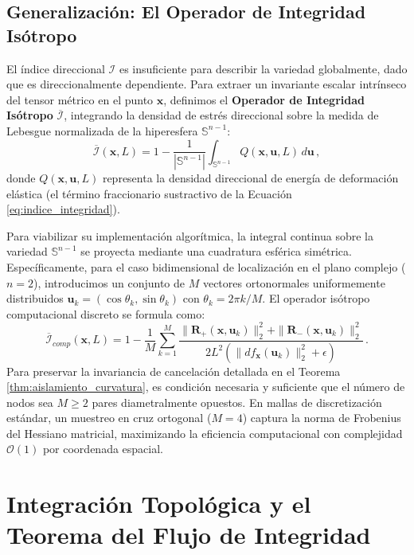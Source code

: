 \documentclass[11pt]{article}
\begin{document}
\subsection{Generalización: El Operador de Integridad Isótropo}

El índice direccional $\mathcal{I}$ es insuficiente para describir la variedad globalmente, dado que es direccionalmente dependiente. Para extraer un invariante escalar intrínseco del tensor métrico en el punto $\mathbf{x}$, definimos el \textbf{Operador de Integridad Isótropo} $\overline{\mathcal{I}}$, integrando la densidad de estrés direccional sobre la medida de Lebesgue normalizada de la hiperesfera $\mathbb{S}^{n-1}$:
\begin{equation}
    \overline{\mathcal{I}}(\mathbf{x}, L) = 1 - \frac{1}{|\mathbb{S}^{n-1}|} \int_{\mathbb{S}^{n-1}} Q(\mathbf{x}, \mathbf{u}, L) \, d\mathbf{u} \,,
\end{equation}
donde $Q(\mathbf{x}, \mathbf{u}, L)$ representa la densidad direccional de energía de deformación elástica (el término fraccionario sustractivo de la Ecuación \eqref{eq:indice_integridad}).

Para viabilizar su implementación algorítmica, la integral continua sobre la variedad $\mathbb{S}^{n-1}$ se proyecta mediante una cuadratura esférica simétrica. Específicamente, para el caso bidimensional de localización en el plano complejo ($n=2$), introducimos un conjunto de $M$ vectores ortonormales uniformemente distribuidos $\mathbf{u}_k = (\cos \theta_k, \sin \theta_k)$ con $\theta_k = 2\pi k / M$. El operador isótropo computacional discreto se formula como:
\begin{equation}
    \overline{\mathcal{I}}_{comp}(\mathbf{x}, L) = 1 - \frac{1}{M} \sum_{k=1}^{M} \frac{\|\mathbf{R}_+(\mathbf{x}, \mathbf{u}_k)\|_2^2 + \|\mathbf{R}_-(\mathbf{x}, \mathbf{u}_k)\|_2^2}{2L^2 \left(\|df_{\mathbf{x}}(\mathbf{u}_k)\|_2^2 + \epsilon\right)} \,.
\end{equation}
Para preservar la invariancia de cancelación detallada en el Teorema \ref{thm:aislamiento_curvatura}, es condición necesaria y suficiente que el número de nodos sea $M \geq 2$ pares diametralmente opuestos. En mallas de discretización estándar, un muestreo en cruz ortogonal ($M=4$) captura la norma de Frobenius del Hessiano matricial, maximizando la eficiencia computacional con complejidad $\mathcal{O}(1)$ por coordenada espacial.


\section{Integración Topológica y el Teorema del Flujo de Integridad}
\label{sec:flujo}
\end{document}
